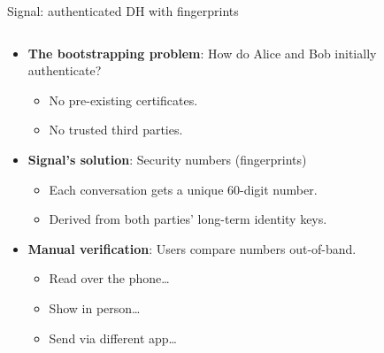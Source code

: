 \documentclass[aspectratio=169, lualatex, handout]{beamer}
\begin{document}
\begin{frame}{Signal: authenticated DH with fingerprints}
	\begin{columns}[c]
		\begin{column}{0.7\textwidth}
			\begin{itemize}[<+->]
				\item \textbf{The bootstrapping problem}: How do Alice and Bob initially authenticate?
				      \begin{itemize}
					      \item No pre-existing certificates.
					      \item No trusted third parties.
				      \end{itemize}
				\item \textbf{Signal's solution}: Security numbers (fingerprints)
				      \begin{itemize}
					      \item Each conversation gets a unique 60-digit number.
					      \item Derived from both parties' long-term identity keys.
				      \end{itemize}
				\item \textbf{Manual verification}: Users compare numbers out-of-band.
				      \begin{itemize}
					      \item Read over the phone\ldots
					      \item Show in person\ldots
					      \item Send via different app\ldots
				      \end{itemize}
			\end{itemize}
		\end{column}
		\begin{column}{0.3\textwidth}
		\end{column}
	\end{columns}
\end{frame}
\end{document}
